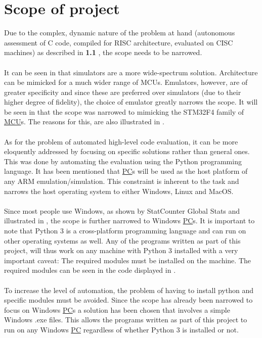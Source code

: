 \section{Scope of project}
\label{scOfWrk}
Due to the complex, dynamic nature of the problem at hand (autonomous assessment of C code, compiled for RISC architecture, evaluated on CISC machines) as described in \textbf{1.1 }, the scope needs to be narrowed. 
\\\\
It can be seen in \textbf{} that simulators are a more wide-spectrum solution. Architecture can be mimicked for a much wider range of MCUs. Emulators, however, are of greater specificity and since these are preferred over simulators (due to their higher degree of fidelity), the choice of emulator greatly narrows the scope. It will be seen in   \textbf{} that the scope was narrowed to mimicking the STM32F4 family of \hyperref[listAbr]{MCU}s. The reasons for this, are also illustrated in \textbf{}.
\\\\
As for the problem of automated high-level code evaluation, it can be more eloquently addressed by focusing on specific solutions rather than general ones. This was done by automating the evaluation using the Python programming language. It has been mentioned that \hyperref[listAbr]{PC}s will be used as the host platform of any ARM emulation/simulation. This constraint is inherent to the task and narrows the host operating system to either Windows, Linux and MacOS.
\\\\
Since most people use Windows, as shown by StatCounter Global Stats and illustrated in \textbf{}, the scope is further narrowed to Windows \hyperref[listAbr]{PC}s. It is important to note that Python 3 is a cross-platform programming language and can run on other operating systems as well. Any of the programs written as part of this project, will thus work on any machine with Python 3 installed with a very important caveat: The required modules must be installed on the machine. The required modules can be seen in the code displayed in \textbf{}.
\\\\
To increase the level of automation, the problem of having to install python and specific modules must be avoided. Since the scope has already been narrowed to focus on Windows \hyperref[listAbr]{PC}s a solution has been chosen that involves a simple Windows .exe files. This allows the programs written as part of this project to run on any Windows \hyperref[listAbr]{PC} regardless of whether Python 3 is installed or not.

